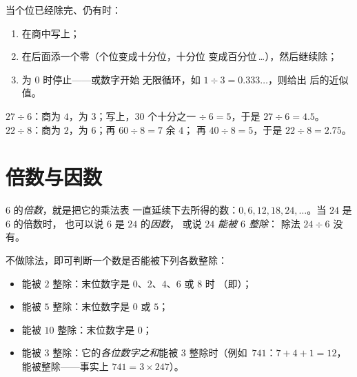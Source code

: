 \begin{method}[把除法延续到小数点之后]\label{met:g5:division:continue}
当个位已经除完、仍有时：
\begin{enumerate}
  \item 在商中写上；
  \item 在后面添一个零（个位变成十分位，十分位
        变成百分位\,\dots），然后继续除；
  \item {}为 $0$ 时停止——或数字开始
        无限循环，如 $1 \div 3 = 0.333\dots$，则给出
        后的近似值。
\end{enumerate}
\end{method}

\begin{example}\label{ex:g5:division:continue}
$27 \div 6$：商为 $4$，为 $3$；写上，$30$ 个十分之一
$\div\ 6 = 5$，于是 $27 \div 6 = 4.5$。\quad
$22 \div 8$：商为 $2$，为 $6$；再 $60 \div 8 = 7$ 余 $4$；
再 $40 \div 8 = 5$，于是 $22 \div 8 = 2.75$。
\end{example}

\section{倍数与因数}

\begin{definition}[倍数、因数]\label{def:g5:division:multiple}
$6$ 的\emph{倍数}，就是把它的乘法表
一直延续下去所得的数：$0, 6, 12, 18, 24, \dots$。当 $24$ 是 $6$ 的倍数时，
也可以说 $6$ 是 $24$ 的\emph{因数}，
或说 $24$ \emph{能被 $6$ 整除}：
除法 $24 \div 6$ 没有。
\end{definition}

\begin{proposition}[整除速判法]\label{prop:g5:division:criteria}
不做除法，即可判断一个数是否能被下列各数整除：
\begin{itemize}
  \item 能被 $2$ 整除：末位数字是 $0$、$2$、$4$、$6$ 或 $8$ 时
        （即）；
  \item 能被 $5$ 整除：末位数字是 $0$ 或 $5$；
  \item 能被 $10$ 整除：末位数字是 $0$；
  \item 能被 $3$ 整除：它的\emph{各位数字之和}能被
        $3$ 整除时（例如\ $741$：$7 + 4 + 1 = 12$，能被整除——事实上
        $741 = 3 \times 247$）。
\end{itemize}
\end{proposition}
\admitted


